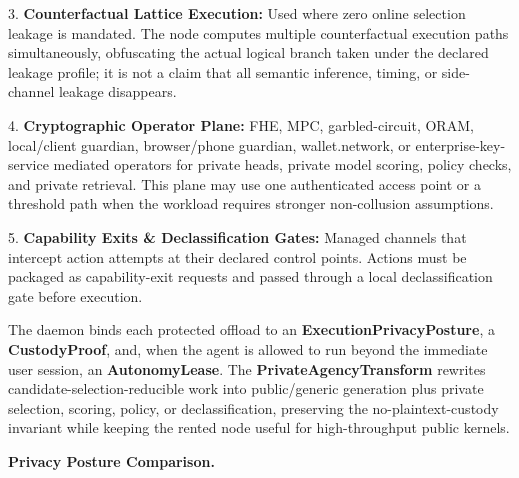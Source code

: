 \documentclass[
  11pt,
]{article}
\begin{document}
3. \textbf{Counterfactual Lattice Execution:} Used where zero online
selection leakage is mandated. The node computes multiple counterfactual
execution paths simultaneously, obfuscating the actual logical branch
taken under the declared leakage profile; it is not a claim that all
semantic inference, timing, or side-channel leakage disappears.

4. \textbf{Cryptographic Operator Plane:} FHE, MPC, garbled-circuit,
ORAM, local/client guardian, browser/phone guardian, wallet.network, or
enterprise-key-service mediated operators for private heads, private
model scoring, policy checks, and private retrieval. This plane may use
one authenticated access point or a threshold path when the workload
requires stronger non-collusion assumptions.

5. \textbf{Capability Exits \& Declassification Gates:} Managed channels
that intercept action attempts at their declared control points.
Actions must be packaged as capability-exit requests and passed through
a local declassification gate before execution.

The daemon binds each protected offload to an
\textbf{ExecutionPrivacyPosture}, a \textbf{CustodyProof}, and, when the
agent is allowed to run beyond the immediate user session, an
\textbf{AutonomyLease}. The \textbf{PrivateAgencyTransform} rewrites
candidate-selection-reducible work into public/generic generation plus
private selection, scoring, policy, or declassification, preserving the
no-plaintext-custody invariant while keeping the rented node useful for
high-throughput public kernels.

\textbf{Privacy Posture Comparison.}
\end{document}

